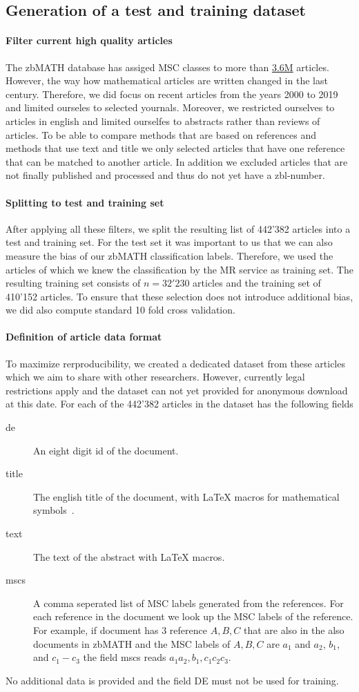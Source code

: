 \subsection{Generation of a test and training dataset}
\paragraph{Filter current high quality articles}
The zbMATH database has assiged MSC classes to more than
\href{https://zbmath.org/?q=cc%3A*}%
{3.6M} articles.
However, the way how mathematical articles are written changed in the last century.
Therefore, we did focus on recent articles from the years 2000 to 2019 and limited ourseles to selected yournals.
Moreover, we restricted ourselves to articles in english and limited ourselfes to abstracts rather than reviews of articles.
To be able to compare methods that are based on references and methods that use text and title we only selected articles that have one reference that
can be matched to another article.
In addition we excluded articles that are not finally published and processed and thus do not yet have a zbl-number.
\paragraph{Splitting to test and training set}
After applying all these filters, we split the resulting list of 442'382 articles into a test and training set.
For the test set it was important to us that we can also measure the bias of our zbMATH classification labels.
Therefore, we used the articles of which we knew the classification by the MR service as training set.
The resulting training set consists of $n=32'230$ articles and the training set of 410'152 articles.
To ensure that these selection does not introduce additional bias, we did also compute standard 10 fold cross validation.
\paragraph{Definition of article data format}
To maximize rerproducibility, we created a dedicated dataset from these articles which we aim to share with other researchers.
However, currently legal restrictions apply and the dataset can not yet provided for anonymous download at this date.
For each of the 442'382 articles in the dataset has the following fields
\begin{description}
  \item[de] An eight digit id of the document.
  \item[title] The english title of the document, with LaTeX macros for mathematical symbols~\cite{Schubotz2019b}.
  \item[text] The text of the abstract with LaTeX macros.
  \item[mscs] A comma seperated list of MSC labels generated from the references. For each reference in the document we look up the MSC labels of the reference. For example, if document has 3 reference $A,B,C$ that are also in the also documents in zbMATH and the MSC labels of $A,B,C$ are $a_1$ and $a_2$, $b_1$, and $c_1-c_3$ the field mscs reads $a_1  a_2, b_1, c_1 c_2 c_3.$
\end{description}
No additional data is provided and the field DE must not be used for training.
